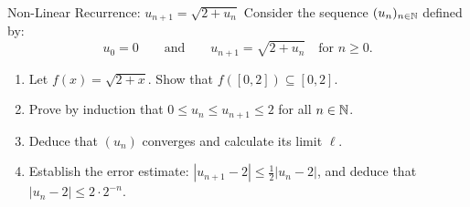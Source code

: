 \begin{exercise}{Non-Linear Recurrence: $u_{n+1} = \sqrt{2 + u_n}$}
Consider the sequence $(u_n)_{n \in \mathbb{N}}$ defined by:
\[
u_0 = 0 \qquad \text{and} \qquad u_{n+1} = \sqrt{2 + u_n} \quad \text{for } n \ge 0.
\]
\begin{enumerate}[leftmargin=1.5em,itemsep=2pt]
  \item Let $f(x) = \sqrt{2 + x}$. Show that $f([0, 2]) \subseteq [0, 2]$.
  \item Prove by induction that $0 \le u_n \le u_{n+1} \le 2$ for all $n \in \mathbb{N}$.
  \item Deduce that $(u_n)$ converges and calculate its limit $\ell$.
  \item Establish the error estimate: $|u_{n+1} - 2| \le \frac{1}{2}|u_n - 2|$, and deduce that $|u_n - 2| \le 2 \cdot 2^{-n}$.
\end{enumerate}
\end{exercise}

\begin{tabletworkspace}[5.5cm]
\end{tabletworkspace}

